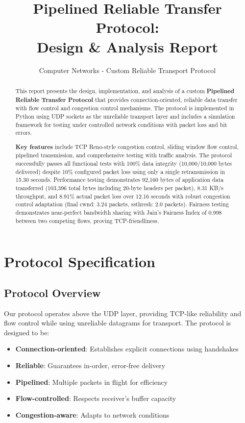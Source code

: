 \documentclass[11pt,a4paper]{article}
\title{\textbf{Pipelined Reliable Transfer Protocol:\\Design \& Analysis Report}}
\author{Computer Networks - Custom Reliable Transport Protocol}
\date{}
\begin{document}
\maketitle
\thispagestyle{empty}

\begin{abstract}
This report presents the design, implementation, and analysis of a custom \textbf{Pipelined Reliable Transfer Protocol} that provides connection-oriented, reliable data transfer with flow control and congestion control mechanisms. The protocol is implemented in Python using UDP sockets as the unreliable transport layer and includes a simulation framework for testing under controlled network conditions with packet loss and bit errors. 

\vspace{0.4cm}
    
    \textbf{Key features} include TCP Reno-style congestion control, sliding window flow control, pipelined transmission, and comprehensive testing with traffic analysis. The protocol successfully passes all functional tests with 100\% data integrity (10,000/10,000 bytes delivered) despite 10\% configured packet loss using only a single retransmission in 15.30 seconds. Performance testing demonstrates 92,160 bytes of application data transferred (103,396 total bytes including 20-byte headers per packet), 8.31 KB/s throughput, and 8.91\% actual packet loss over 12.16 seconds with robust congestion control adaptation (final cwnd: 3.24 packets, ssthresh: 2.0 packets). Fairness testing demonstrates near-perfect bandwidth sharing with Jain's Fairness Index of 0.998 between two competing flows, proving TCP-friendliness.
\end{abstract}

\newpage
\tableofcontents
\newpage

\section{Protocol Specification}

\subsection{Protocol Overview}

Our protocol operates above the UDP layer, providing TCP-like reliability and flow control while using unreliable datagrams for transport. The protocol is designed to be:

\begin{itemize}
    \item \textbf{Connection-oriented}: Establishes explicit connections using handshakes
    \item \textbf{Reliable}: Guarantees in-order, error-free delivery
    \item \textbf{Pipelined}: Multiple packets in flight for efficiency
    \item \textbf{Flow-controlled}: Respects receiver's buffer capacity
    \item \textbf{Congestion-aware}: Adapts to network conditions
\end{itemize}
\end{document}
